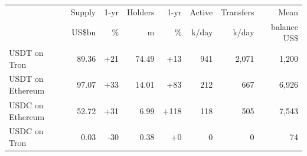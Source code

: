 \begin{tabular}{lrrrrrrr}
\toprule
 & Supply & 1-yr & Holders & 1-yr & Active & Transfers & Mean \\
 & US\$bn & \% & m & \% & k/day & k/day & balance US\$ \\
\midrule
USDT on Tron & 89.36 & +21 & 74.49 & +13 & 941 & 2,071 & 1,200 \\
USDT on Ethereum & 97.07 & +33 & 14.01 & +83 & 212 & 667 & 6,926 \\
USDC on Ethereum & 52.72 & +31 & 6.99 & +118 & 118 & 505 & 7,543 \\
USDC on Tron & 0.03 & -30 & 0.38 & +0 & 0 & 0 & 74 \\
\bottomrule
\end{tabular}